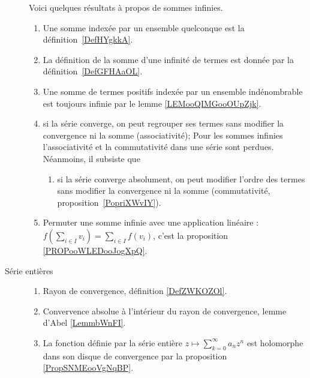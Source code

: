 \begin{description}
        Voici quelques résultats à propos de sommes infinies.%
        \begin{enumerate}
            \item
Une somme indexée par un ensemble quelconque est la définition~\ref{DefHYgkkA}.
    \item
        La définition de la somme d'une infinité de termes est donnée par la définition~\ref{DefGFHAaOL}.
    \item
        Une somme de termes positifs indexée par un ensemble indénombrable est toujours infinie par le lemme \ref{LEMooQIMGooOUpZjk}.
  \item
      si la série converge, on peut regrouper ses termes sans modifier la convergence ni la somme (associativité);
    Pour les sommes infinies l'associativité et la commutativité dans une série sont perdues. Néanmoins, il subsiste que
  \begin{enumerate}
  \item
      si la série converge absolument, on peut modifier l'ordre des termes sans modifier la convergence ni la somme (commutativité, proposition~\ref{PopriXWvIY}).
  \end{enumerate}
  \item Permuter une somme infinie avec une application linéaire : \( f(\sum_{i\in I}v_i)=\sum_{i\in I}f(v_i)\), c'est la proposition \ref{PROPooWLEDooJogXpQ}.
        \end{enumerate}
    \item[Série entières]
        \begin{enumerate}
            \item
                Rayon de convergence, définition \ref{DefZWKOZOl}.
            \item
                Convervence absolue à l'intérieur du rayon de convergence, lemme d'Abel \ref{LemmbWnFI}.
            \item
            La fonction définie par la série entière  \(z\mapsto \sum_{k=0}^{\infty}a_nz^n\) est holomorphe dans son disque de convergence par la proposition \ref{PropSNMEooVgNqBP}.
        \end{enumerate}
\end{description}



